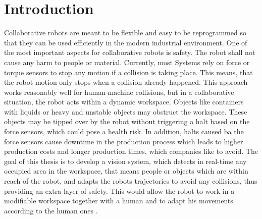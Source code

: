\chapter{Introduction}
\label{chap:introduction}
Collaborative robots are meant to be flexible and easy to be reprogrammed so that they can be used efficiently in the modern industrial environment. One of the most important aspects for collaborative robots is safety. The robot shall not cause any harm to people or material. Currently, most Systems rely on force or torque sensors to stop any motion if a collision is taking place. This means, that the robot motion only stops when a collision already happened. 
This approach works reasonably well for human-machine collisions, but in a collaborative situation, the robot acts within a dynamic workspace. Objects like containers with liquids or heavy and unstable objects may obstruct the workspace. These objects may be tipped over by the robot without triggering a halt based on the force sensors, which could pose a health risk.
In addition, halts caused ba the force sensors cause downtime in the production process which leads to higher production costs and longer production times, which companies like to avoid.
The goal of this thesis is to develop a vision system, which detects in real-time any occupied area in the workspace, that means people or objects which are within reach of the robot, and adapts the robots trajectories to avoid any collisions, thus providing an extra layer of safety. This would allow the robot to work in a modifiable workspace together with a human and to adapt his movements according to the human ones \cite{work_desc}. 


